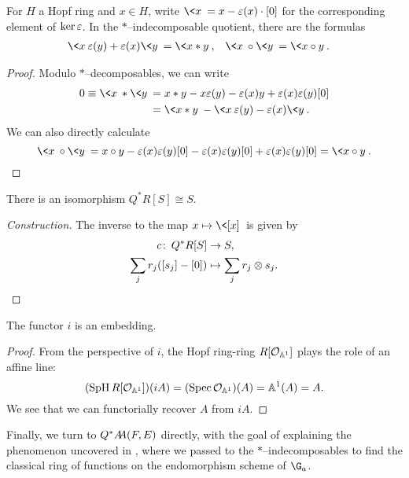 \begin{lemma}\label{ArithmeticInQAst}
For \(H\) a Hopf ring and \(x \in H\), write \(\<x\> = x - \eps(x) \cdot [0]\) for the corresponding element of \(\ker \eps\).  In the \(\ast\)--indecomposable quotient, there are the formulas
\begin{align*}
\<x\>\eps(y) + \eps(x)\<y\> & = \<x \ast y\>, &
\<x\> \circ \<y\> & = \<x \circ y\>.
\end{align*}
\end{lemma}
\begin{proof}
Modulo \(\ast\)--decomposables, we can write
\begin{align*}
0 \equiv \<x\> \ast \<y\> & = x \ast y - x \eps(y) - \eps(x) y + \eps(x) \eps(y) [0] \\
& = \<x \ast y\> - \<x\>\eps(y) - \eps(x)\<y\>.
\end{align*}
We can also directly calculate \[\<x\> \circ \<y\> = x \circ y - \eps(x) \eps(y) [0] - \eps(x) \eps(y) [0] + \eps(x) \eps(y) [0] = \<x \circ y\>. \qedhere\]
\end{proof}

\begin{corollary}\label{QAstAndTensors}
There is an isomorphism \(Q^* R[S] \cong S\).
\end{corollary}
\begin{proof}[Construction]
The inverse to the map \(x \mapsto \<[x]\>\) is given by
\begin{align*}
c\co Q^* R[S] & \to S, \\
\sum_j r_j ([s_j] - [0]) & \mapsto \sum_j r_j \otimes s_j. \qedhere
\end{align*}
\end{proof}

\begin{corollary}\label{iEmbeds}
The functor \(i\) is an embedding.
\end{corollary}
\begin{proof}
From the perspective of \(i\), the Hopf ring-ring \(R[\sheaf O_{\mathbb A^1}]\) plays the role of an affine line: \[(\SpH R[\sheaf O_{\mathbb A^1}])(iA) = (\Spec \sheaf O_{\mathbb A^1})(A) = \mathbb A^1(A) = A.\]  We see that we can functorially recover \(A\) from \(iA\).
\end{proof}


Finally, we turn to \(Q^* \AA(F, E)\) directly, with the goal of explaining the phenomenon uncovered in , where we passed to the \(\ast\)--indecomposables to find the classical ring of functions on the endomorphism scheme of \(\G_a\).

